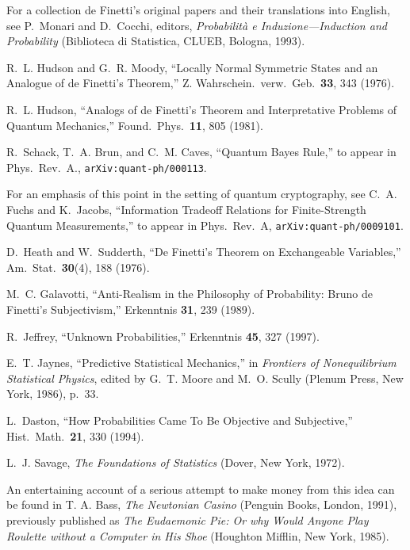 \documentclass[12pt,aps,eqsecnum]{revtex4-1}
\begin{document}
\begin{thebibliography}{10}
For a collection de Finetti's original papers and their translations
into English, see P.~Monari and D.~Cocchi, editors, {\sl Probabilit\`a
e Induzione---Induc\-tion and Probability\/} (Biblioteca di Statistica,
CLUEB, Bologna, 1993).

R.~L. Hudson and G.~R. Moody, ``Locally Normal Symmetric States and
an Analogue of de Finetti's Theorem,'' Z. Wahrschein.\ verw.\ Geb.\
{\bf 33}, 343 (1976).

R.~L. Hudson, ``Analogs of de Finetti's Theorem and Interpretative
Problems of Quantum Mechanics,'' Found.\ Phys.\ {\bf 11}, 805 (1981).

R.~Schack, T.~A. Brun, and C.~M. Caves, ``Quantum Bayes Rule,''
to appear in Phys.\ Rev.~A., {\tt arXiv:quant-ph/000113}.

For an emphasis of this point in the setting of quantum
cryptography, see C.~A. Fuchs and K.~Jacobs, ``Information
Tradeoff Relations for Finite-Strength Quantum Measurements,'' to
appear in Phys.\ Rev.\ A, {\tt arXiv:quant-ph/0009101}.

D.~Heath and W.~Sudderth, ``De Finetti's Theorem on Exchangeable
Variables,'' Am.\ Stat.\ {\bf 30}(4), 188 (1976).

M.~C. Galavotti, ``Anti-Realism in the Philosophy of Probability:
Bruno de Finetti's Subjectivism,'' Erkenntnis {\bf 31}, 239 (1989).

R.~Jeffrey, ``Unknown Probabilities,'' Erkenntnis {\bf 45}, 327
(1997).

E.~T. Jaynes, ``Predictive Statistical Mechanics,'' in {\sl Frontiers
of Nonequilibrium Statistical Physics}, edited by G.~T. Moore and
M.~O. Scully (Plenum Press, New York, 1986), p.\ 33.

L.~Daston, ``How Probabilities Came To Be Objective and Subjective,''
Hist.\ Math.\ {\bf 21}, 330 (1994).

L.~J. Savage, {\sl The Foundations of Statistics\/} (Dover, New York,
1972).

An entertaining account of a serious attempt to make money from
this idea can be found in T. A. Bass, {\sl The Newtonian Casino\/}
(Penguin Books, London, 1991), previously published as {\sl The
Eudaemonic Pie: Or why Would Anyone Play Roulette without a Computer
in His Shoe\/} (Houghton Mifflin, New York, 1985).


\end{thebibliography}
\end{document}
